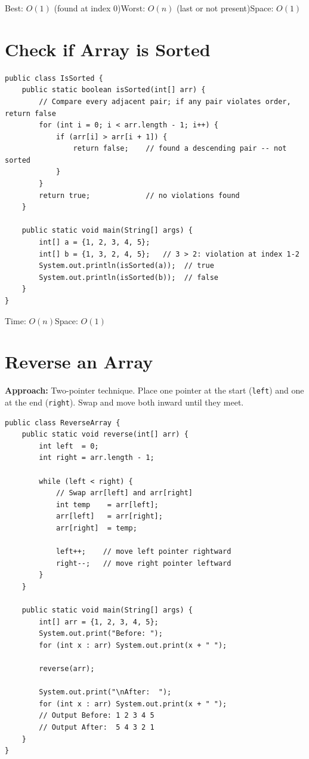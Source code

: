 \documentclass[12pt,a4paper,oneside]{book}
\begin{document}
\begin{complexity}
Best: $O(1)$ (found at index 0)\quad Worst: $O(n)$ (last or not present)\quad Space: $O(1)$
\end{complexity}

\section{Check if Array is Sorted}

\begin{lstlisting}[caption={Is the array sorted in ascending order?}]
public class IsSorted {
    public static boolean isSorted(int[] arr) {
        // Compare every adjacent pair; if any pair violates order, return false
        for (int i = 0; i < arr.length - 1; i++) {
            if (arr[i] > arr[i + 1]) {
                return false;    // found a descending pair -- not sorted
            }
        }
        return true;             // no violations found
    }

    public static void main(String[] args) {
        int[] a = {1, 2, 3, 4, 5};
        int[] b = {1, 3, 2, 4, 5};   // 3 > 2: violation at index 1-2
        System.out.println(isSorted(a));  // true
        System.out.println(isSorted(b));  // false
    }
}
\end{lstlisting}

\begin{complexity}
Time: $O(n)$\quad Space: $O(1)$
\end{complexity}

\section{Reverse an Array}

\textbf{Approach:} Two-pointer technique. Place one pointer at the start (\texttt{left}) and one at the end (\texttt{right}). Swap and move both inward until they meet.

\begin{lstlisting}[caption={Reverse Array --- Two Pointer, in-place}]
public class ReverseArray {
    public static void reverse(int[] arr) {
        int left  = 0;
        int right = arr.length - 1;

        while (left < right) {
            // Swap arr[left] and arr[right]
            int temp    = arr[left];
            arr[left]   = arr[right];
            arr[right]  = temp;

            left++;    // move left pointer rightward
            right--;   // move right pointer leftward
        }
    }

    public static void main(String[] args) {
        int[] arr = {1, 2, 3, 4, 5};
        System.out.print("Before: ");
        for (int x : arr) System.out.print(x + " ");

        reverse(arr);

        System.out.print("\nAfter:  ");
        for (int x : arr) System.out.print(x + " ");
        // Output Before: 1 2 3 4 5
        // Output After:  5 4 3 2 1
    }
}
\end{lstlisting}
\end{document}
